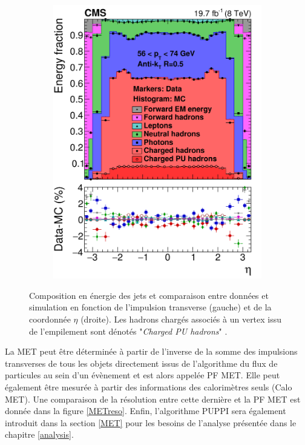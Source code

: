 \begin{figure}
\begin{subfigure}{0.5\linewidth}
    \includegraphics[width=\linewidth]{Chapitre4/Images/PFJetETA.png} 
    \caption*{} 
    \end{subfigure}
    \caption{Composition en énergie des jets et comparaison entre données et simulation en fonction de l'impulsion transverse (gauche) et de la coordonnée $\eta$ (droite). Les hadrons chargés associés à un vertex issu de l'empilement sont dénotés "\textit{Charged PU hadrons}" \cite{ThePFAlgo}.}
    \label{JetEnergy}
\end{figure}

La MET peut être déterminée à partir de l'inverse de la somme des impulsions transverses de tous les objets directement issus de l'algorithme du flux de particules au sein d'un évènement et est alors appelée PF MET. Elle peut également être mesurée à partir des informations des calorimètres seuls (Calo MET). Une comparaison de la résolution entre cette dernière et la PF MET est donnée dans la figure \ref{METreso}. Enfin, l'algorithme PUPPI \cite{puppi} sera également introduit dans la section \ref{MET} pour les besoins de l'analyse présentée dans le chapitre \ref{analysis}.

